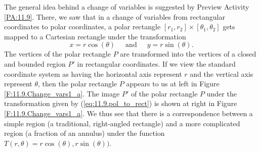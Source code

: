 The general idea behind a change of variables is suggested by Preview Activity \ref{PA:11.9}.  There, we saw that in a change of variables from rectangular coordinates to polar coordinates, a polar rectangle $[r_1, r_2] \times [\theta_1, \theta_2]$ gets mapped to a Cartesian rectangle under the transformation
\begin{equation*}
x = r \cos(\theta)  \ \ \ \ \ \text{ and } \ \ \ \ \ y = r \sin(\theta).
\end{equation*}
The vertices of the polar rectangle $P$ are
transformed into the vertices 
of a closed and bounded region $P'$ in
rectangular coordinates. If we view the standard coordinate system as having the horizontal axis represent $r$ and the vertical axis represent $\theta$, then the polar
rectangle $P$ appears to us at left in Figure
\ref{F:11.9.Change_vars1_a}. The image $P'$ of the polar rectangle $P$
under the transformation given by (\ref{eq:11.9.pol_to_rect}) is shown at right in
Figure \ref{F:11.9.Change_vars1_a}.   We thus see that there is a correspondence between a simple region (a traditional, right-angled rectangle) and a more complicated region (a fraction of an annulus) under the function $T(r, \theta) = r\cos(\theta), r\sin(\theta))$.

